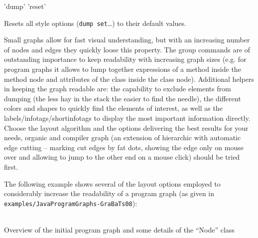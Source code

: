 \begin{rail}
  'dump' 'reset'
\end{rail}
Resets all style options (\texttt{dump set}\dots) to their default values.


\begin{note}
Small graphs allow for fast visual understanding, but with an increasing number of nodes and edges they quickly loose this property.
The group commands are of outstanding importance to keep readability with increasing graph sizes
(e.g. for program graphs it allows to lump together expressions of a method inside the method node and attributes of the class inside the class node).
Additional helpers in keeping the graph readable are: 
the capability to exclude elements from dumping (the less hay in the stack the easier to find the needle),
the different colors and shapes to quickly find the elements of interest,
as well as the labels/infotags/shortinfotags to display the most important information directly. 
Choose the layout algorithm and the options delivering the best results for your needs, organic and compiler graph 
(an extension of hierarchic with automatic edge cutting -- marking cut edges by fat dots, showing the edge only on mouse over and allowing to jump to the other end on a mouse click)
should be tried first.
\end{note}

The following example shows several of the layout options employed to considerably increase the readability of a program graph (as given in \texttt{examples/JavaProgramGraphs-GraBaTs08}):
\begin{center}
    \hfill {}\\
  {\small Overview of the initial program graph and some details of the ``Node'' class}
\end{center}


